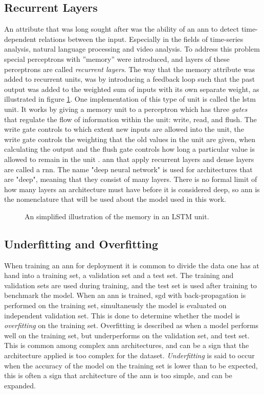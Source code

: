 \subsection{Recurrent Layers}
An attribute that was long sought after was the ability of an \acrshort{ann} to detect time-dependent relations between the input. Especially in the fields of time-series analysis, natural language processing and video analysis. To address this problem special perceptrons with ''memory'' were introduced, and layers of these perceptrons are called \textit{recurrent layers}. The way that the memory attribute was added to recurrent units, was by introducing a feedback loop such that the past output was added to the weighted sum of inputs with its own separate weight, as illustrated in figure \ref{fig:lstm}. One implementation of this type of unit is called the \acrfull{lstm} unit. It works by giving a memory unit to a perceptron which has three \textit{gates} that regulate the flow of information within the unit: write, read, and flush. The write gate controls to which extent new inputs are allowed into the unit, the write gate controls the weighting that the old values in the unit are given, when calculating the output and the flush gate controls how long a particular value is allowed to remain in the unit \cite{lstm_wikipedia}. \acrshort{ann} that apply recurrent layers and dense layers are called a \acrfull{rnn}. The name "deep neural network" is used for architectures that are "deep", meaning that they consist of many layers. There is no formal limit of how many layers an architecture must have before it is considered deep, so \acrfull{ann} is the nomenclature that will be used about the model used in this work. 

\begin{figure}[H]
    \centering
    
    \caption{An simplified illustration of the memory in an LSTM unit.}
    \label{fig:lstm}
\end{figure}

\subsection{Underfitting and Overfitting}
When training an \acrshort{ann} for deployment it is common to divide the data one has at hand into a training set, a validation set and a test set. The training and validation sets are used during training, and the test set is used after training to benchmark the model. When an \acrshort{ann} is trained, \acrshort{sgd} with back-propagation is performed on the training set, simultaneusly the model is evaluated on independent validation set. This is done to determine whether the model is \textit{overfitting} on the training set. Overfitting is described as when a model performs well on the training set, but underperforms on the validation set, and test set. This is common among complex \acrshort{ann} architectures, and can be a sign that the architecture applied is too complex for the dataset. \textit{Underfitting} is said to occur when the accuracy of the model on the training set is lower than to be expected, this is often a sign that architecture of the \acrshort{ann} is too simple, and can be expanded.

